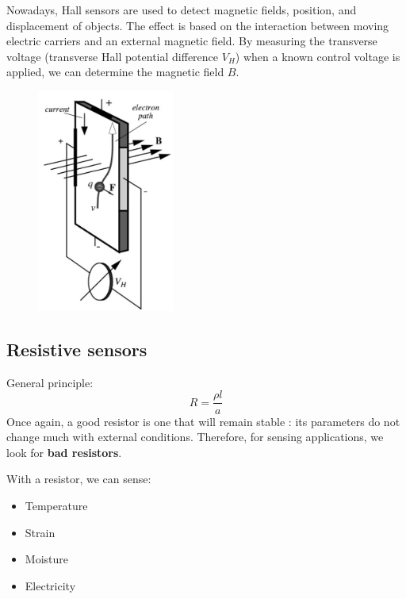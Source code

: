 \begin{minipage}{0.5 \linewidth}

Nowadays, Hall sensors are used to detect magnetic fields,
position, and displacement of objects. The effect is based on the interaction between moving electric carriers and an
external magnetic field. By measuring the transverse voltage (transverse Hall potential difference $V_H$) when a known control voltage is applied, we can determine the magnetic field $B$.

\end{minipage}\hfill
\begin{minipage}{0.5 \linewidth}
\begin{figure}[H]
    \centering
    \includegraphics[width = 0.4\textwidth]{L2/img/hall.PNG}
\end{figure}
\end{minipage}

\subsection{Resistive sensors}

General principle:
\[
    R = \frac{\rho l}{a}
\]
Once again, a good resistor is one that will remain stable : its parameters do not change much with external conditions. Therefore, for sensing applications, we look for \textbf{bad resistors}. 

With a resistor, we can sense:
\begin{itemize}
    \item Temperature
    \item Strain
    \item Moisture
    \item Electricity
\end{itemize}

